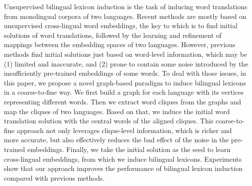 Unsupervised bilingual lexicon induction is the task of inducing word translations from monolingual corpora of two languages. Recent methods are mostly based on unsupervised cross-lingual word embeddings, the key to which is to find initial solutions of word translations, followed by the learning and refinement of mappings between the embedding spaces of two languages. However, previous methods find initial solutions just based on word-level information, which may be (1) limited and inaccurate, and (2) prone to contain some noise introduced by the insufficiently pre-trained embeddings of some words. To deal with those issues, in this paper, we propose a novel graph-based paradigm to induce bilingual lexicons in a coarse-to-fine way. We first build a graph for each language with its vertices representing different words. Then we extract word cliques from the graphs and map the cliques of two languages. Based on that, we induce the initial word translation solution with the central words of the aligned cliques. This coarse-to-fine approach not only leverages clique-level information, which is richer and more accurate, but also effectively reduces the bad effect of the noise in the pre-trained embeddings. Finally, we take the initial solution as the seed to learn cross-lingual embeddings, from which we induce bilingual lexicons. Experiments show that our approach improves the performance of bilingual lexicon induction compared with previous methods.
